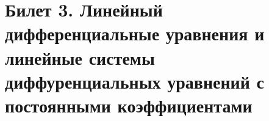 \documentclass[a4paper, 12pt]{article}
\begin{document}
    
    \tableofcontents{} %
    \newpage


    
    
    \newpage
    
    
    
    \newpage
    \section{Билет 3. Линейный дифференциальные уравнения и линейные системы диффуренциальных уравнений с постоянными коэффициентами}
    
    
    
    
    
    


    
    
    
    
    \newpage
    
    
    
    
    
    
\end{document}
